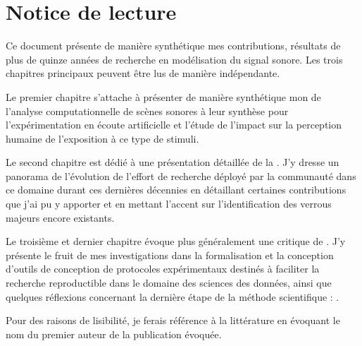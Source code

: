 \chapter{\nmu Notice \nmu de lecture} \label{chap:notice}

Ce document présente de manière synthétique mes contributions, résultats de plus de quinze années de recherche en modélisation du signal sonore. Les trois chapitres principaux peuvent être lus de manière indépendante.

Le premier chapitre s'attache à présenter de manière synthétique mon  de l'analyse computationnelle de scènes sonores à leur synthèse pour l'expérimentation en écoute artificielle et l'étude de l'impact sur la perception humaine de l'exposition à ce type de stimuli.

Le second chapitre est dédié à une présentation détaillée de la . J'y dresse un panorama de l'évolution de l'effort de recherche déployé par la communauté dans ce domaine durant ces dernières décennies en détaillant certaines contributions que j'ai pu y apporter et en mettant l'accent sur l'identification des verrous majeurs encore existants.

Le troisième et dernier chapitre évoque plus généralement une critique de . J'y présente le fruit de mes investigations dans la formalisation et la conception d'outils de conception de protocoles expérimentaux destinés à faciliter la recherche reproductible dans le domaine des sciences des données, ainsi que quelques réflexions concernant la dernière étape de la méthode scientifique : .

Pour des raisons de lisibilité, je ferais référence à la littérature en évoquant le nom du premier auteur de la publication évoquée.

